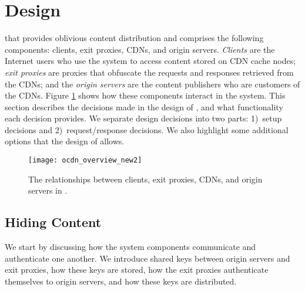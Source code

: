 \section{Design}
\label{sec:design}

\system{} that provides oblivious content distribution and  
comprises the following components: clients, exit proxies, CDNs, and origin 
servers.  {\em Clients} are the Internet users who use the system to access content
stored on CDN cache nodes; {\em exit proxies} are proxies that obfuscate the requests
and responses retrieved from the CDNs; and the {\em origin servers} are the content
publishers who are customers of the CDNs.  Figure \ref{fig:ocd_overview} shows how
these components interact in the system.  This section describes the decisions 
made in the design of \system{}, and what functionality each decision provides.  
We separate design decisions into two parts: 1)~setup decisions and 2)~request/response decisions.  We also highlight some additional options that the design of 
\system{} allows.

\begin{figure}[t!]
\centering
\texttt{[image: ocdn\_overview\_new2]}
\caption{The relationships between clients, exit proxies, CDNs, and origin servers in 
\system{}.}
\label{fig:ocd_overview}
\end{figure}

\subsection{Hiding Content}
\label{sec:hiding_content}
We start by discussing how the system components communicate and authenticate 
one another. We introduce shared keys between origin servers and exit proxies, how these keys
are stored, how the exit proxies authenticate themselves to origin servers, and how these 
keys are distributed.


